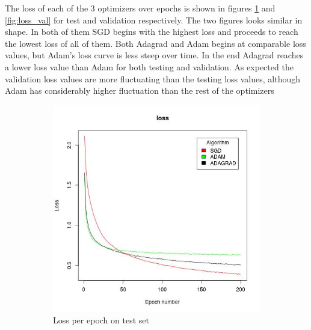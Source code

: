 \documentclass[12pt,twoside]{article}
\theoremstyle{plain}
\theoremstyle{definition}
\theoremstyle{remark}
\begin{document}
The loss of each of the 3 optimizers over epochs is shown in figures \ref{fig:loss} and \ref{fig:loss_val} for test and validation respectively. The two figures looks similar in shape. In both of them SGD begins with the highest loss and proceeds to reach the lowest loss of all of them. Both Adagrad and Adam begins at comparable loss values, but Adam's loss curve is less steep over time. In the end Adagrad reaches a lower loss value than Adam for both testing and validation. As expected the validation loss values are more fluctuating than the testing loss values, although Adam has considerably higher fluctuation  than the rest of the optimizers
\begin{figure}[H]
  \centering
  \begin{subfigure}{.5\textwidth}
    \centering
    \includegraphics[scale=.46]{Code/loss.jpg}
    \caption{Loss per epoch on test set}
    \label{fig:loss}
  \end{subfigure}%
  \begin{subfigure}{.5\textwidth}
    \centering

\end{subfigure}
\end{figure}
\end{document}

